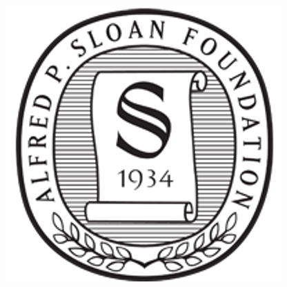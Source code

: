 \documentclass[11pt,xcolor=dvipsnames]{beamer}
\begin{document}
\begin{frame}
\begin{overlayarea}{12cm}{4cm}
{\begin{columns}
\begin{column}{0.12\linewidth}
\end{column}
\begin{column}{0.12\linewidth}
\includegraphics[width=0.9\linewidth]{images/sloan_foundation.png}
\end{column}
\end{columns}
}


\end{overlayarea}
\end{frame}
\end{document}
